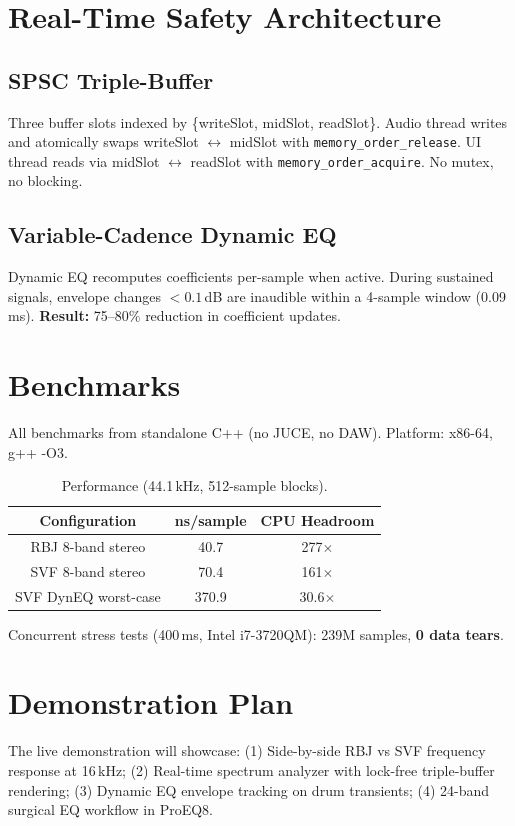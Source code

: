 \documentclass[10pt,twocolumn,a4paper]{article}
\begin{document}
\section{Real-Time Safety Architecture}

\subsection{SPSC Triple-Buffer}
Three buffer slots indexed by \{writeSlot, midSlot, readSlot\}. Audio thread writes and atomically swaps writeSlot $\leftrightarrow$ midSlot with \texttt{memory\_order\_release}. UI thread reads via midSlot $\leftrightarrow$ readSlot with \texttt{memory\_order\_acquire}. No mutex, no blocking.

\subsection{Variable-Cadence Dynamic EQ}
Dynamic EQ recomputes coefficients per-sample when active. During sustained signals, envelope changes $< 0.1$\,dB are inaudible within a 4-sample window (0.09\,ms). \textbf{Result:} 75--80\% reduction in coefficient updates.

\section{Benchmarks}
All benchmarks from standalone C++ (no JUCE, no DAW). Platform: x86-64, g++ -O3.

\begin{table}[ht]
  \caption{Performance (44.1\,kHz, 512-sample blocks).}
  \centering
  \begin{tabular}{ccc}\toprule
    Configuration & ns/sample & CPU Headroom \\\midrule
    RBJ 8-band stereo & 40.7 & 277$\times$ \\
    SVF 8-band stereo & 70.4 & 161$\times$ \\
    SVF DynEQ worst-case & 370.9 & 30.6$\times$ \\\bottomrule
  \end{tabular}
\end{table}

Concurrent stress tests (400\,ms, Intel i7-3720QM): 239M samples, \textbf{0 data tears}.

\section{Demonstration Plan}
The live demonstration will showcase: (1) Side-by-side RBJ vs SVF frequency response at 16\,kHz; (2) Real-time spectrum analyzer with lock-free triple-buffer rendering; (3) Dynamic EQ envelope tracking on drum transients; (4) 24-band surgical EQ workflow in ProEQ8.
\end{document}

